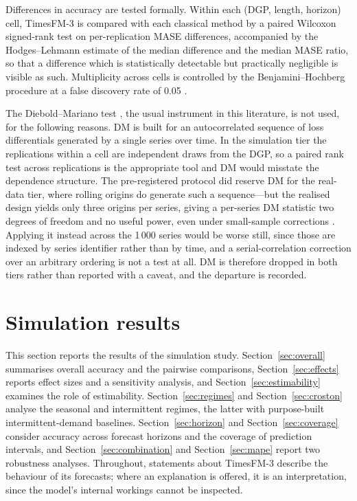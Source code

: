 \documentclass[11pt]{article}
\providecommand{\sectionref}[1]{Section~\ref{#1}}
\begin{document}
Differences in accuracy are tested formally. Within each (DGP, length, horizon)
cell, TimesFM-3 is compared with each classical method by a paired Wilcoxon signed-rank test
\citep{wilcoxon1945} on per-replication MASE differences, accompanied by the Hodges--Lehmann
estimate of the median difference \citep{hodges1963} and the median MASE ratio, so that a
difference which is statistically detectable but practically negligible is visible as such.
Multiplicity across cells is controlled by the Benjamini--Hochberg procedure at a false
discovery rate of 0.05 \citep{benjamini1995fdr}.

The Diebold--Mariano test \citep{diebold1995comparing}, the usual instrument in this
literature, is not used, for the following reasons. DM is built for an autocorrelated sequence of loss differentials
generated by a single series over time. In the simulation tier the replications within a cell
are independent draws from the DGP, so a paired rank test across replications is the
appropriate tool and DM would misstate the dependence structure. The pre-registered protocol
did reserve DM for the real-data tier, where rolling origins do generate such a sequence---but
the realised design yields only three origins per series, giving a per-series DM statistic two
degrees of freedom and no useful power, even under small-sample corrections \citep{harvey1997testing}. Applying it instead across the 1\,000 series would be
worse still, since those are indexed by series identifier rather than by time, and a
serial-correlation correction over an arbitrary ordering is not a test at all. DM is therefore
dropped in both tiers rather than reported with a caveat, and the departure is recorded.

\section{Simulation results}
\label{sec:results}

This section reports the results of the simulation study. \sectionref{sec:overall} summarises
overall accuracy and the pairwise comparisons, \sectionref{sec:effects} reports effect sizes and a
sensitivity analysis, and \sectionref{sec:estimability} examines the role of estimability.
\sectionref{sec:regimes} and \sectionref{sec:croston} analyse the seasonal and intermittent
regimes, the latter with purpose-built intermittent-demand baselines. \sectionref{sec:horizon}
and \sectionref{sec:coverage} consider accuracy across forecast horizons and the coverage of
prediction intervals, and \sectionref{sec:combination} and \sectionref{sec:mape} report two
robustness analyses. Throughout, statements about TimesFM-3 describe the behaviour of its
forecasts; where an explanation is offered, it is an interpretation, since the model's internal
workings cannot be inspected.
\end{document}
